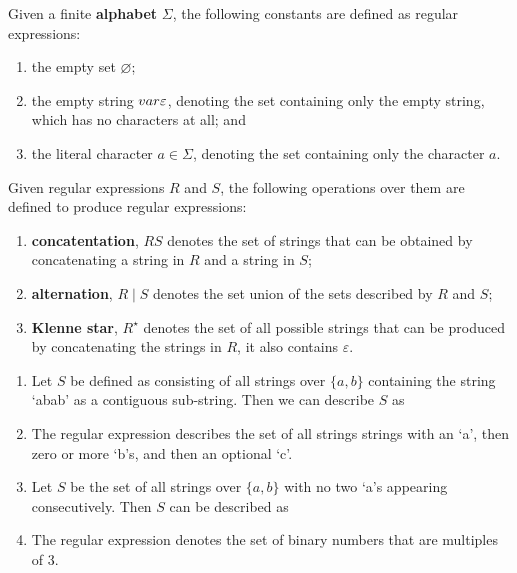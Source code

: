 \begin{definition}
    Given a finite \textbf{alphabet} $\Sigma$, the following constants  are defined as regular expressions:
    \begin{enumerate}
        \item the empty set $\varnothing$;
        \item the empty string $\\var\varepsilon$, denoting the set containing only the empty string, which has no characters at all; and
        \item the literal character $a \in \Sigma$, denoting the set containing only the character $a$.
    \end{enumerate}
    Given regular expressions $R$ and $S$, the following operations over them are defined to produce regular expressions:
    \begin{enumerate}
        \item \textbf{concatentation}, $RS$ denotes the set of strings that can be obtained by concatenating a string in $R$ and a string in $S$;
        \item \textbf{alternation}, $R \mid S$ denotes the set union of the sets described by $R$ and $S$;
        \item \textbf{Klenne star}, $R^\star$ denotes the set of all possible strings that can be produced by concatenating the strings in $R$, it also contains $\varepsilon$.
    \end{enumerate}
\end{definition}

\begin{example}
    \begin{enumerate}
        \item Let $S$ be defined as consisting of all strings over $\{ a, b \}$ containing the string `abab' as a contiguous sub-string. Then we can describe $S$ as 
        \item The regular expression  describes the set of all strings strings with an `a', then zero or more `b's, and then an optional `c'.
        \item Let $S$ be the set of all strings over $\{ a, b \}$ with no two `a's  appearing consecutively. Then $S$ can be described as 
        \item The regular expression  denotes the set of binary numbers that are multiples of 3.
    \end{enumerate}
\end{example}

